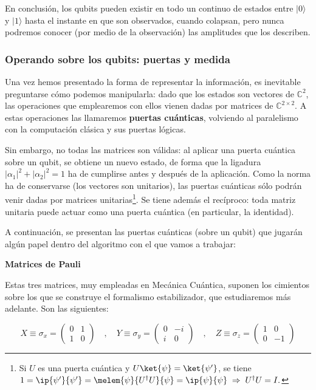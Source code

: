 \documentclass[11pt,a4paper,twoside,pdf]{article}
\numberwithin{equation}{section}
\begin{document}
		En conclusión, los qubits pueden existir en todo un continuo de estados entre $|0\rangle$ y $|1\rangle$ hasta el instante en que son observados, cuando colapsan, pero nunca podremos conocer (por medio de la observación) las amplitudes que los describen.
						
		\subsubsection{Operando sobre los qubits: puertas y medida} \label{subsubsec: puertas}
			
		Una vez hemos presentado la forma de representar la información, es inevitable preguntarse cómo podemos manipularla: dado que los estados son vectores de $\mathbb{C}^2$, las operaciones que emplearemos con ellos vienen dadas por matrices de $\mathbb{C}^{2\times 2}$. A estas operaciones las llamaremos \textbf{puertas cuánticas}, volviendo al paralelismo con la computación clásica y sus puertas lógicas.
				 
		Sin embargo, no todas las matrices son válidas: al aplicar una puerta cuántica sobre un qubit, se obtiene un nuevo estado, de forma que la ligadura $ |\alpha_1|^2+|\alpha_2|^2=1 $ ha de cumplirse antes y después de la aplicación. Como la norma ha de conservarse (los vectores son unitarios), las puertas cuánticas sólo podrán venir dadas por matrices unitarias\footnote{ Si $U$ es una puerta cuántica y $U\ket{\psi}=\ket{\psi'}$, se tiene $ 1 = \ip{\psi'}{\psi'} = \melem{\psi}{U^{\dagger}U}{\psi} = \ip{\psi}{\psi}  \; \Rightarrow \; U^{\dagger}U=I .$}.
		Se tiene además el recíproco: toda matriz unitaria puede actuar como una puerta cuántica (en particular, la identidad).
		
		A continuación, se presentan las puertas cuánticas (sobre un qubit) que jugarán algún papel dentro del algoritmo con el que vamos a trabajar:
		
		\begin{flushleft}{\textbf{Matrices de Pauli }}\end{flushleft}
			Estas tres matrices, muy empleadas en Mecánica Cuántica, suponen los cimientos sobre los que se construye el formalismo estabilizador, que estudiaremos más adelante. Son las siguientes:
		
				\begin{equation} \label{eq: Pauli}
					X \equiv \sigma_x = \left(\begin{array}{cc}0 & 1\\1 & 0\end{array}\right)		\quad , \quad
					Y \equiv \sigma_y = \left(\begin{array}{cc}0 & -i\\i & 0\end{array}\right)		 \quad , \quad
					Z \equiv \sigma_z = \left(\begin{array}{cc}1 & 0\\0 & -1\end{array}\right)		
				\end{equation}		 
				 
\end{document}
